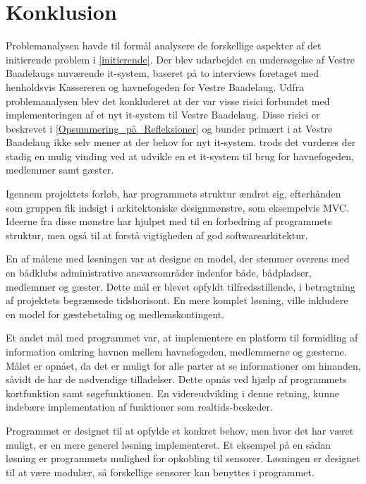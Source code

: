 \chapter{Konklusion}
\label{cha:konklusion}

Problemanalysen havde til formål analysere de forskellige aspekter af det initierende problem i \cref{initierende}. Der blev udarbejdet en undersøgelse af Vestre Baadelaugs nuværende it-system, baseret på to interviews foretaget med henholdsvis Kassereren og havnefogeden for Vestre Baadelaug. Udfra problemanalysen blev det konkluderet at der var visse risici forbundet med implementeringen af et nyt it-system til Vestre Baadelaug. Disse risici er beskrevet i \cref{Opsummering_på_Refleksioner} og bunder primært i at Vestre Baadelaug ikke selv mener at der behov for nyt it-system. 
trods det vurderes der stadig en mulig vinding ved at udvikle en et it-system til brug for havnefogeden, medlemmer samt gæster.  



Igennem projektets forløb, har programmets struktur ændret sig, efterhånden som gruppen fik indsigt i arkitektoniske designmønstre, som eksempelvis MVC. Ideerne fra disse mønstre har hjulpet med til en forbedring af programmets struktur, men også til at forstå vigtigheden af god softwarearkitektur.

En af målene med løsningen var at designe en model, der stemmer overens med en bådklubs administrative ansvarsområder indenfor både, bådpladser, medlemmer og gæster. Dette mål er blevet opfyldt tilfredsstillende, i betragtning af projektets begrænsede tidshorisont. En mere komplet løsning, ville inkludere en model for gæstebetaling og medlemskontingent.

Et andet mål med programmet var, at implementere en platform til formidling af information omkring havnen mellem havnefogeden, medlemmerne og gæsterne. Målet er opnået, da det er muligt for alle parter at se informationer om hinanden, såvidt de har de nødvendige tilladelser. Dette opnås ved hjælp af programmets kortfunktion samt søgefunktionen. En videreudvikling i denne retning, kunne indebære implementation af funktioner som realtids-beskeder.

Programmet er designet til at opfylde et konkret behov, men hvor det har været muligt, er en mere generel løsning implementeret. Et eksempel på en sådan løsning er programmets mulighed for opkobling til sensorer. Løsningen er designet til at være modulær, så forskellige sensorer kan benyttes i programmet.


